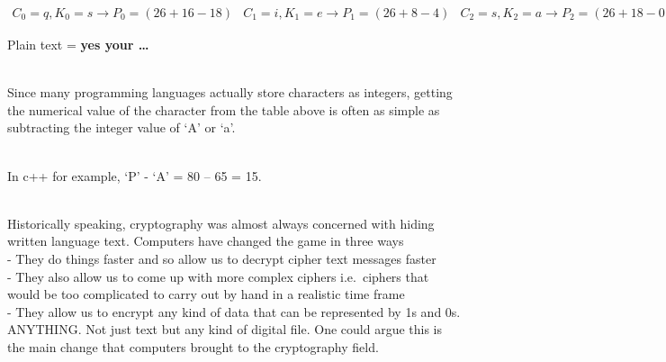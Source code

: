 \documentclass[
  letterpaper,
  DIV=11,
  numbers=noendperiod]{scrartcl}
\begin{document}
\begin{math}
    \begin{aligned}
    C_0 = q, K_0 = s → P_0 = (26+16-18)%
    \end{aligned}

    \begin{aligned}
    C_1 = i, K_1 = e → P_1 = (26+8-4)%
    \end{aligned}

    \begin{aligned}
    C_2 = s, K_2 = a → P_2 = (26+18-0)%
    \end{aligned}

    \begin{aligned}
    C_3 = a, K_3 = c → P_3 = (26+0-2)%
    \end{aligned}

    \begin{aligned}
    C_4 = f, K_4 = r → P_4 = (26+5-17)%
    \end{aligned}

    \begin{aligned}
    C_5 = y, K_5 = e → P_5 = (26+24-4)%
    \end{aligned}

    \begin{aligned}
    C_6 = r, K_6 = a → P_6 = (26+17-0)%
    \end{aligned}

    \begin{aligned}
    … 
    \end{aligned}
\end{math}

Plain text = \textbf{yes your \ldots{}}\\
\strut \\
Since many programming languages actually store characters as integers,
getting the numerical value of the character from the table above is
often as simple as subtracting the integer value of `A' or `a'.\\
\strut \\
In c++ for example, `P' - `A' = 80 -- 65 = 15.\\
\strut \\
Historically speaking, cryptography was almost always concerned with
hiding written language text. Computers have changed the game in three
ways\\
- They do things faster and so allow us to decrypt cipher text messages
faster\\
- They also allow us to come up with more complex ciphers i.e.~ciphers
that would be too complicated to carry out by hand in a realistic time
frame\\
- They allow us to encrypt any kind of data that can be represented by
1s and 0s. ANYTHING. Not just text but any kind of digital file. One
could argue this is the main change that computers brought to the
cryptography field.
\end{document}
